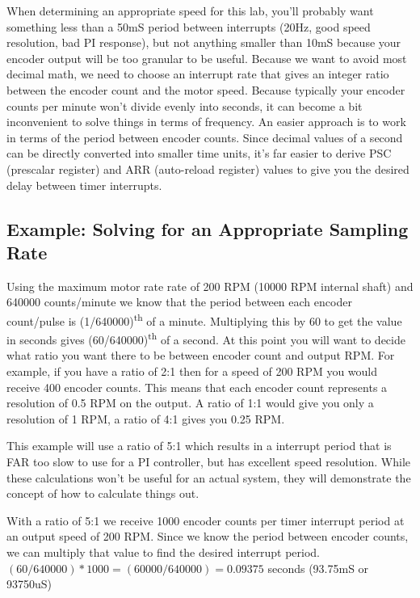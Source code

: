 \documentclass[openany,11pt,fleqn]{book} %
\begin{document}
When determining an appropriate speed for this lab, you'll probably want something less than a 50mS period between interrupts (20Hz, good speed resolution, bad PI response), but not anything smaller than 10mS because your encoder output will be too granular to be useful. Because we want to avoid most decimal math, we need to choose an interrupt rate that gives an integer ratio between the encoder count and the motor speed. Because typically your encoder counts per minute won't divide evenly into seconds, it can become a bit inconvenient to solve things in terms of frequency. An easier approach is to work in terms of the period between encoder counts. Since decimal values of a second can be directly converted into smaller time units, it's far easier to derive PSC (prescalar register) and ARR (auto-reload register) values to give you the desired delay between timer interrupts.


\subsection{Example: Solving for an Appropriate Sampling Rate}

Using the maximum motor rate rate of 200 RPM (10000 RPM internal shaft) and 640000 counts/minute we know that the period between each encoder count/pulse is (1/640000)\textsuperscript{th} of a minute. Multiplying this by 60 to get the value in seconds gives (60/640000)\textsuperscript{th} of a second. 
At this point you will want to decide what ratio you want there to be between encoder count and output RPM. For example, if you have a ratio of 2:1 then for a speed of 200 RPM you would receive 400 encoder counts. This means that each encoder count represents a resolution of 0.5 RPM on the output. A ratio of 1:1 would give you only a resolution of 1 RPM, a ratio of 4:1 gives you 0.25 RPM. 

This example will use a ratio of 5:1 which results in a interrupt period that is FAR too slow to use for a PI controller, but has excellent speed resolution. While these calculations won't be useful for an actual system, they will demonstrate the concept of how to calculate things out. 

With a ratio of 5:1 we receive 1000 encoder counts per timer interrupt period at an output speed of 200 RPM. Since we know the period between encoder counts, we can multiply that value to find the desired interrupt period. $(60/640000)*1000 = (60000/640000) = 0.09375$ seconds (93.75mS or 93750uS)
\end{document}
